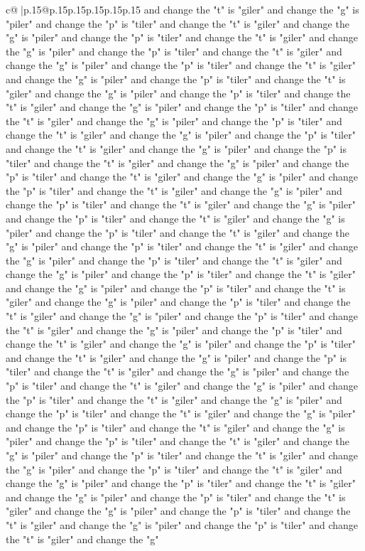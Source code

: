 \documentclass{article}
\begin{document}
{\begin{supertabular}{c@{$\;$}|p{.15\linewidth}@{}p{.15\linewidth}p{.15\linewidth}p{.15\linewidth}p{.15\linewidth}p{.15\linewidth}}
{{{and change the "t" is "giler" and change the "g" is "piler" and change the "p" is "tiler" and change the "t" is "giler" and change the "g" is "piler" and change the "p" is "tiler" and change the "t" is "giler" and change the "g" is "piler" and change the "p" is "tiler" and change the "t" is "giler" and change the "g" is "piler" and change the "p" is "tiler" and change the "t" is "giler" and change the "g" is "piler" and change the "p" is "tiler" and change the "t" is "giler" and change the "g" is "piler" and change the "p" is "tiler" and change the "t" is "giler" and change the "g" is "piler" and change the "p" is "tiler" and change the "t" is "giler" and change the "g" is "piler" and change the "p" is "tiler" and change the "t" is "giler" and change the "g" is "piler" and change the "p" is "tiler" and change the "t" is "giler" and change the "g" is "piler" and change the "p" is "tiler" and change the "t" is "giler" and change the "g" is "piler" and change the "p" is "tiler" and change the "t" is "giler" and change the "g" is "piler" and change the "p" is "tiler" and change the "t" is "giler" and change the "g" is "piler" and change the "p" is "tiler" and change the "t" is "giler" and change the "g" is "piler" and change the "p" is "tiler" and change the "t" is "giler" and change the "g" is "piler" and change the "p" is "tiler" and change the "t" is "giler" and change the "g" is "piler" and change the "p" is "tiler" and change the "t" is "giler" and change the "g" is "piler" and change the "p" is "tiler" and change the "t" is "giler" and change the "g" is "piler" and change the "p" is "tiler" and change the "t" is "giler" and change the "g" is "piler" and change the "p" is "tiler" and change the "t" is "giler" and change the "g" is "piler" and change the "p" is "tiler" and change the "t" is "giler" and change the "g" is "piler" and change the "p" is "tiler" and change the "t" is "giler" and change the "g" is "piler" and change the "p" is "tiler" and change the "t" is "giler" and change the "g" is "piler" and change the "p" is "tiler" and change the "t" is "giler" and change the "g" is "piler" and change the "p" is "tiler" and change the "t" is "giler" and change the "g" is "piler" and change the "p" is "tiler" and change the "t" is "giler" and change the "g" is "piler" and change the "p" is "tiler" and change the "t" is "giler" and change the "g" is "piler" and change the "p" is "tiler" and change the "t" is "giler" and change the "g" is "piler" and change the "p" is "tiler" and change the "t" is "giler" and change the "g" is "piler" and change the "p" is "tiler" and change the "t" is "giler" and change the "g" is "piler" and change the "p" is "tiler" and change the "t" is "giler" and change the "g" is "piler" and change the "p" is "tiler" and change the "t" is "giler" and change the "g" is "piler" and change the "p" is "tiler" and change the "t" is "giler" and change the "g" is "piler" and change the "p" is "tiler" and change the "t" is "giler" and change the "g" is "piler" and change the "p" is "tiler" and change the "t" is "giler" and change the "g" is "piler" and change the "p" is "tiler" and change the "t" is "giler" and change the "g" }}}
\end{supertabular}}
\end{document}
